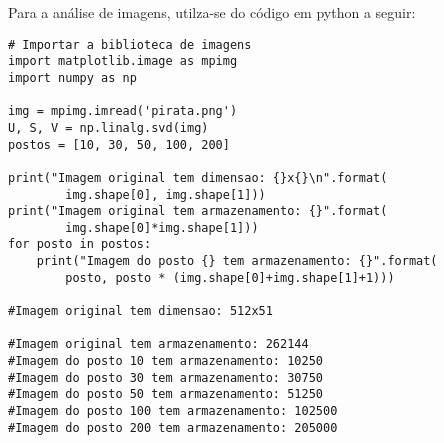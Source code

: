 Para a análise de imagens, utilza-se do código em python a seguir:\\

\begin{lstlisting}
# Importar a biblioteca de imagens
import matplotlib.image as mpimg
import numpy as np
    
img = mpimg.imread('pirata.png')
U, S, V = np.linalg.svd(img) 
postos = [10, 30, 50, 100, 200]
    
print("Imagem original tem dimensao: {}x{}\n".format(
        img.shape[0], img.shape[1]))
print("Imagem original tem armazenamento: {}".format(
        img.shape[0]*img.shape[1]))
for posto in postos:
    print("Imagem do posto {} tem armazenamento: {}".format(
        posto, posto * (img.shape[0]+img.shape[1]+1)))

#Imagem original tem dimensao: 512x51

#Imagem original tem armazenamento: 262144
#Imagem do posto 10 tem armazenamento: 10250
#Imagem do posto 30 tem armazenamento: 30750
#Imagem do posto 50 tem armazenamento: 51250
#Imagem do posto 100 tem armazenamento: 102500
#Imagem do posto 200 tem armazenamento: 205000
\end{lstlisting}